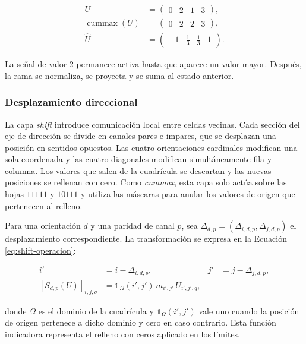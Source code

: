 \documentclass[11pt,a4paper,spanish]{book}
\numberwithin{equation}{chapter}
\numberwithin{figure}{chapter}
\begin{document}
\begin{equation}\label{eq:cummax-ejemplo}
\begin{aligned}
U&=\begin{pmatrix}0&2&1&3\end{pmatrix},\\
\operatorname{cummax}(U)
 &=\begin{pmatrix}0&2&2&3\end{pmatrix},\\
\widehat{U}
 &=\begin{pmatrix}-1&\tfrac{1}{3}&\tfrac{1}{3}&1\end{pmatrix}.
\end{aligned}
\end{equation}

La señal de valor \(2\) permanece activa hasta que aparece un valor mayor. Después, la rama se normaliza, se proyecta y se suma al
estado anterior.

\subsubsection{Desplazamiento direccional}

La capa \textit{shift} introduce comunicación local entre celdas vecinas. Cada sección del eje de dirección se divide en canales pares
e impares, que se desplazan una posición en sentidos opuestos. Las cuatro orientaciones cardinales modifican una sola coordenada y las
cuatro diagonales modifican simultáneamente fila y columna. Los valores que salen de la cuadrícula se descartan y las nuevas posiciones
se rellenan con cero. Como \textit{cummax}, esta capa solo actúa sobre las hojas \(11111\) y \(10111\) y utiliza las máscaras
para anular los valores de origen que pertenecen al relleno.

Para una orientación \(d\) y una paridad de canal \(p\), sea
\(\Delta_{d,p}=(\Delta_{i,d,p},\Delta_{j,d,p})\) el desplazamiento correspondiente. La transformación se expresa en la Ecuación
\eqref{eq:shift-operacion}:

\begin{equation}\label{eq:shift-operacion}
\begin{aligned}
i'&=i-\Delta_{i,d,p},
&j'&=j-\Delta_{j,d,p},\\[1mm]
[S_{d,p}(U)]_{i,j,q}
&=\mathbb{1}_{\Omega}(i',j')\,m_{i',j'}\,U_{i',j',q},
\end{aligned}
\end{equation}

donde \(\Omega\) es el dominio de la cuadrícula y \(\mathbb{1}_{\Omega}(i',j')\) vale uno cuando la posición de origen pertenece
a dicho dominio y cero en caso contrario. Esta función indicadora representa el relleno con ceros aplicado en los límites.
\end{document}
